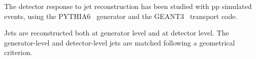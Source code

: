 \documentclass[a4paper]{jpconf}
\begin{document}
The detector response to jet reconstruction has been studied with pp simulated events, using the PYTHIA6~\cite{pythia6} generator
and the GEANT3~\cite{geant3} transport code.

Jets are reconstructed both at generator level and at detector level. The generator-level and detector-level jets
are matched following a geometrical criterion. 

\end{document}
